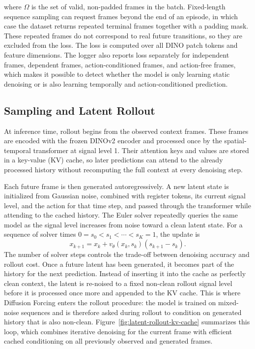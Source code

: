 \documentclass[12pt]{report}
\begin{document}
where $\Omega$ is the set of valid, non-padded frames in the batch. Fixed-length sequence sampling can request frames beyond the end of an episode, in which case the dataset returns repeated terminal frames together with a padding mask. These repeated frames do not correspond to real future transitions, so they are excluded from the loss. The loss is computed over all DINO patch tokens and feature dimensions. The logger also reports loss separately for independent frames, dependent frames, action-conditioned frames, and action-free frames, which makes it possible to detect whether the model is only learning static denoising or is also learning temporally and action-conditioned prediction.

\subsection{Sampling and Latent Rollout}
At inference time, rollout begins from the observed context frames. These frames are encoded with the frozen DINOv2 encoder and processed once by the spatial-temporal transformer at signal level 1. Their attention keys and values are stored in a key-value (KV) cache, so later predictions can attend to the already processed history without recomputing the full context at every denoising step.

Each future frame is then generated autoregressively. A new latent state is initialized from Gaussian noise, combined with register tokens, its current signal level, and the action for that time step, and passed through the transformer while attending to the cached history. The Euler solver repeatedly queries the same model as the signal level increases from noise toward a clean latent state. For a sequence of solver times $0=s_0 < s_1 < \cdots < s_K=1$, the update is
\begin{equation}
\label{eq:euler-update}
x_{k+1}=x_k + v_\theta(x_k,s_k)(s_{k+1}-s_k).
\end{equation}
The number of solver steps controls the trade-off between denoising accuracy and rollout cost. Once a future latent has been generated, it becomes part of the history for the next prediction. Instead of inserting it into the cache as perfectly clean context, the latent is re-noised to a fixed non-clean rollout signal level before it is processed once more and appended to the KV cache. This is where Diffusion Forcing enters the rollout procedure: the model is trained on mixed-noise sequences and is therefore asked during rollout to condition on generated history that is also non-clean. Figure~\ref{fig:latent-rollout-kv-cache} summarizes this loop, which combines iterative denoising for the current frame with efficient cached conditioning on all previously observed and generated frames.
\end{document}
